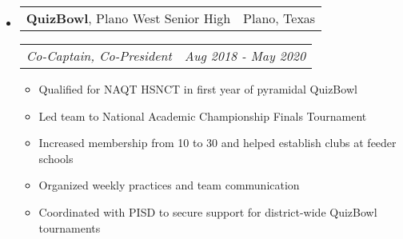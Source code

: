 \documentclass[letterpaper,11pt]{article}
\makeatletter
\newcommand{\resitem}[1]{\item #1 \vspace{-3pt}}
\newcommand{\ressubheading}[4]{
	\begin{tabular*}{7.0in}{l@{\extracolsep{\fill}}r}
			#1 & #2 \\
	\end{tabular*}
	\begin{tabular*}{7.0in}{l@{\extracolsep{\fill}}r}
			\textit{#3} & \textit{#4} \\
	\end{tabular*}\vspace{-6pt}}
\makeatother
\begin{document}
\begin{itemize}
\vspace{-3pt}
\item
	\ressubheading{\textbf{QuizBowl}, Plano West Senior High}{Plano, Texas}{Co-Captain, Co-President}{Aug 2018 - May 2020}
		\begin{itemize}
			\resitem{Qualified for NAQT HSNCT in first year of pyramidal QuizBowl}
			\resitem{Led team to National Academic Championship Finals Tournament}
			\resitem{Increased membership from 10 to 30 and helped establish clubs at feeder schools}
			\resitem{Organized weekly practices and team communication}
			\resitem{Coordinated with PISD to secure support for district-wide QuizBowl tournaments}
		\end{itemize}





\end{itemize}
\end{document}
